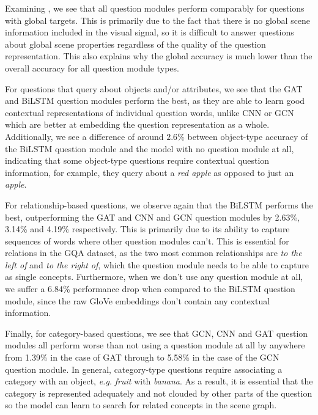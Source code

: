 Examining \tableautorefname{ \ref{table:question_ablation_semantic}}, we see that all question modules perform comparably for questions with global targets. This is primarily due to the fact that there is no global scene information included in the visual signal, so it is difficult to answer questions about global scene properties regardless of the quality of the question representation. This also explains why the global accuracy is much lower than the overall accuracy for all question module types.

For questions that query about objects and/or attributes, we see that the GAT and BiLSTM question modules perform the best, as they are able to learn good contextual representations of individual question words, unlike CNN or GCN which are better at embedding the question representation as a whole. Additionally, we see a difference of around \(2.6\%\) between object-type accuracy of the BiLSTM question module and the model with no question module at all, indicating that some object-type questions require contextual question information, for example, they query about a \textit{red apple} as opposed to just an \textit{apple}.

For relationship-based questions, we observe again that the BiLSTM performs the best, outperforming the GAT and CNN and GCN question modules by 2.63\%, 3.14\% and 4.19\% respectively. This is primarily due to its ability to capture sequences of words where other question modules can't. This is essential for relations in the GQA dataset, as the two most common relationships are \textit{to the left of} and \textit{to the right of}, which the question module needs to be able to capture as single concepts. Furthermore, when we don't use any question module at all, we suffer a 6.84\% performance drop when compared to the BiLSTM question module, since the raw GloVe embeddings don't contain any contextual information.

Finally, for category-based questions, we see that GCN, CNN and GAT question modules all perform worse than not using a question module at all by anywhere from 1.39\% in the case of GAT through to 5.58\% in the case of the GCN question module. In general, category-type questions require associating a category with an object, \textit{e.g.} \textit{fruit} with \textit{banana}. As a result, it is essential that the category is represented adequately and not clouded by other parts of the question so the model can learn to search for related concepts in the scene graph.

